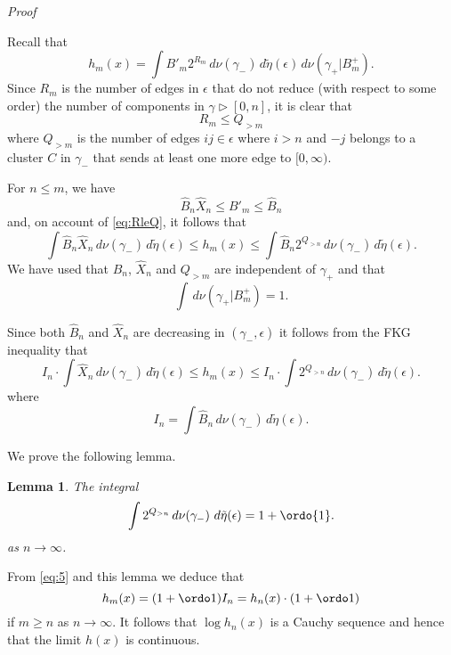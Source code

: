\documentclass[11pt, a4paper]{amsart}
\newtheorem{lemma}[thm]{Lemma}
\theoremstyle{definition}
\theoremstyle{remark}
\renewcommand{\d}{\,d}
\providecommand{\e}{\epsilon}
\providecommand{\tl}{\tilde}
\providecommand{\g}{\gamma}
\begin{document}
\noindent
{\em Proof} \newline

\noindent
Recall that
\begin{equation}\label{eq:3}
  h_m(x) =  \int B'_m 2^{R_m} \d \nu(\g_-)\d\tl\eta(\e) \d \nu(\g_+|B_m^+).
\end{equation}
Since $R_m$ is the number of edges in $\e$ that do not reduce (with respect to
some order) the number of components in $\g\triangleright [0,n]$, it is clear
that
\begin{equation}\label{eq:RleQ}
  R_m \le Q_{>m}
\end{equation}
where \(Q_{>m}\) is the number of edges $ij\in\e$ where $i>n$ and $-j$ belongs
to a cluster $C$ in $\g_-$ that sends at least one more edge to $[0,\infty)$.

For $n\le m$, we have
$$ \hat B_n \hat X_n \le B'_m \le \hat B_n $$
and, on account of \eqref{eq:RleQ}, it follows that
\begin{equation}\label{eq:4}
  \int \hat B_n \hat X_n \d \nu(\g_-) \d\tl\eta(\e)
  \le h_m(x) \le \int \hat B_n 2^{Q_{>n}} \d\nu(\g_-) \d\tl\eta(\e).
\end{equation}
We have used that $\hat B_n$, $\hat X_n$ and $Q_{>m}$ are independent of $\g_+$ and that
$$\int\d\nu(\g_+|B_m^+)=1. $$

Since both $\hat B_n$ and $\hat X_n$ are decreasing in $(\g_-,\e)$ it follows
from the FKG inequality that
\begin{equation}
  \label{eq:5}
  I_n \cdot \int \hat X_n \d\nu(\g_-) \d\tl\eta(\e)
  \le h_m(x)
  \le I_n \cdot \int 2^{Q_{>n}} \d\nu(\g_-) \d\tl\eta(\e).
\end{equation}
where
\begin{equation}
  \label{eq:6}
  I_n = \int \hat B_n \d\nu(\g_-) \d\tl\eta(\e).
\end{equation}

We prove the following lemma.
\begin{lemma}\label{lem:qn}
  The integral
  \[
    \int 2^{Q_{>n}} \d\nu(\g_-)\, \d\tilde\eta(\e) = 1+\ordo{1}.
  \]
  as $n\to\infty$.
\end{lemma}

From \eqref{eq:5} and this lemma we deduce that
\begin{equation}
  \label{eq:2}
  h_m(x) = (1+\ordo1) I_n = h_n(x) \cdot (1+\ordo1)
\end{equation}
if $m\ge n$ as $n\to\infty$. It follows that $\log h_n(x)$ is a Cauchy sequence
and hence that the limit $h(x)$ is continuous.
\end{document}
